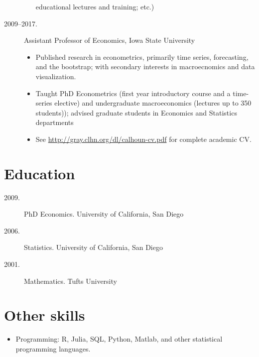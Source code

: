 \documentclass[11pt]{safecv}%
\begin{document}
\begin{description}
\begin{itemize}
    educational lectures and training; etc.)
  \end{itemize}
\item[2009--2017.] Assistant Professor of Economics, Iowa State University
  \begin{itemize}
  \item Published research in econometrics, primarily time
    series, forecasting, and the bootstrap; with secondary interests
    in macroecnomics and data visualization.
   \item Taught PhD Econometrics (first year introductory course and
     a time-series elective) and undergraduate macroeconomics (lectures up to 350 students)); advised
     graduate students in Economics and Statistics departments
   \item See \url{http://gray.clhn.org/dl/calhoun-cv.pdf} for
     complete academic CV.
   \end{itemize}
\end{description}

\section*{Education}

\begin{description}
\item[2009.] PhD Economics. University of California, San Diego
\item[2006.]  Statistics. University of California, San Diego
\item[2001.]  Mathematics. Tufts University
\end{description}

\section*{Other skills}

\begin{itemize}
\item Programming: R, Julia, SQL, Python, Matlab, and other statistical
  programming languages.
\end{itemize}
\end{document}
